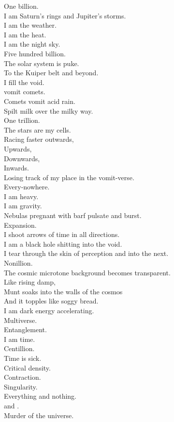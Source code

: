One billion. \\
I am Saturn's rings and Jupiter's storms. \\
I am the weather. \\
I am the  heat. \\
I am the night sky. \\

Five hundred billion. \\
The solar system is puke. \\
To the Kuiper belt and beyond. \\
I fill the void. \\
 vomit comets. \\
Comets vomit acid rain. \\
Spilt milk over the milky way. \\

One trillion. \\
The stars are my cells. \\
Racing faster outwards, \\
Upwards, \\
Downwards, \\
Inwards. \\
Losing track of my place in the vomit-verse. \\
Every-nowhere. \\

I am heavy. \\
I am gravity. \\
Nebulas pregnant with barf pulsate and burst. \\
Expansion. \\
I shoot arrows of time in all directions. \\
I am a black hole shitting into the void. \\
I tear through the skin of perception and into the next. \\

Nonillion. \\
The cosmic microtone background becomes transparent. \\
Like rising damp, \\
Munt soaks into the walls of the cosmos \\
And it topples like soggy bread. \\
I am dark energy accelerating. \\
Multiverse. \\

Entanglement. \\
I am time. \\
Centillion. \\
Time is sick. \\
Critical density. \\
Contraction. \\
Singularity. \\
Everything and nothing. \\
 and . \\

Murder of the universe. \\
